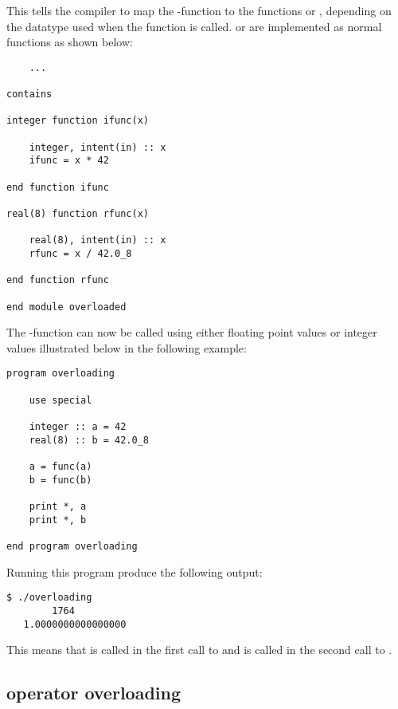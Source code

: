 This tells the compiler to map the -function to the functions  or , depending on the datatype used when the function is called.  or  are implemented as normal functions as shown below:

\begin{lstlisting}
	...
	
contains

integer function ifunc(x)
	
	integer, intent(in) :: x
	ifunc = x * 42
	
end function ifunc

real(8) function rfunc(x)
	
	real(8), intent(in) :: x
	rfunc = x / 42.0_8
	
end function rfunc

end module overloaded
\end{lstlisting}

The -function can now be called using either floating point values or integer values illustrated below in the following example:

\begin{lstlisting}
program overloading

	use special
	
	integer :: a = 42
	real(8) :: b = 42.0_8
	
	a = func(a)
	b = func(b)
	
	print *, a
	print *, b 
	
end program overloading
\end{lstlisting}

Running this program produce the following output:

\cmdmode

\begin{lstlisting}
$ ./overloading 
        1764
   1.0000000000000000
\end{lstlisting}%

\fmode

This means that  is called in the first call to  and  is called in the second call to .

\subsection{operator overloading}

